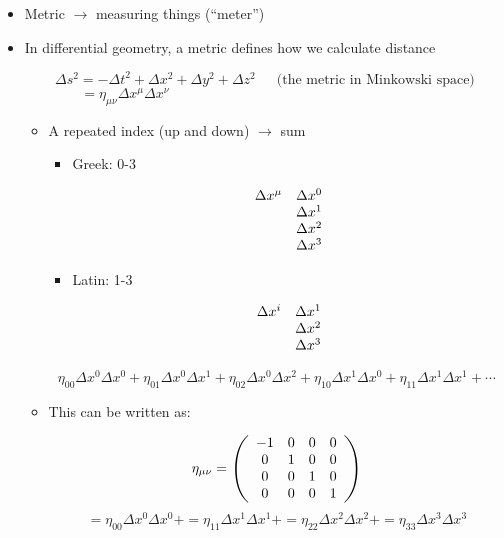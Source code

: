 \begin{itemize}

  \item Metric $\to$ measuring things (``meter'')

  \item In differential geometry, a metric defines how we calculate distance

    $$\Delta s^2=-\Delta t^2+\Delta x^2+\Delta y^2+\Delta z^2\,\quad\text{ (the metric in Minkowski space)}$$
    $$=\eta_{\mu\nu}\Delta x^{\mu}\Delta x^{\nu}\quad\quad\quad\quad\quad\quad\quad\quad\quad\quad\quad\quad\quad\quad\quad\quad\quad\quad\quad\quad$$

    \begin{itemize}

      \item A repeated index (up and down) $\to$ sum

        \begin{itemize}

          \item Greek: 0-3

            $$\begin{array}{l r} \Delta x^{\mu} & \Delta x^0\\ & \Delta x^1\\ & \Delta x^2\\ & \Delta x^3\end{array}$$

          \item Latin: 1-3

            $$\begin{array}{l r} \Delta x^{i} & \Delta x^1\\ & \Delta x^2\\ & \Delta x^3\end{array}$$

        \end{itemize}

        $$\eta_{00}\Delta x^0\Delta x^0+\eta_{01}\Delta x^0\Delta x^1+\eta_{02}\Delta x^0\Delta x^2+\eta_{10}\Delta x^1\Delta x^0+\eta_{11}\Delta x^1\Delta x^1+\cdots$$

      \item This can be written as:

        $$\eta_{\mu\nu}=\left( \begin{array}{c c c c} -1 & 0 & 0 & 0\\ 0 & 1 & 0 & 0\\ 0 & 0 & 1 & 0\\ 0 & 0 & 0 & 1\\ \end{array}\right)$$
        $$=\eta_{00}\Delta x^0\Delta x^0+=\eta_{11}\Delta x^1\Delta x^1+=\eta_{22}\Delta x^2\Delta x^2+=\eta_{33}\Delta x^3\Delta x^3$$

    \end{itemize}

\end{itemize}



